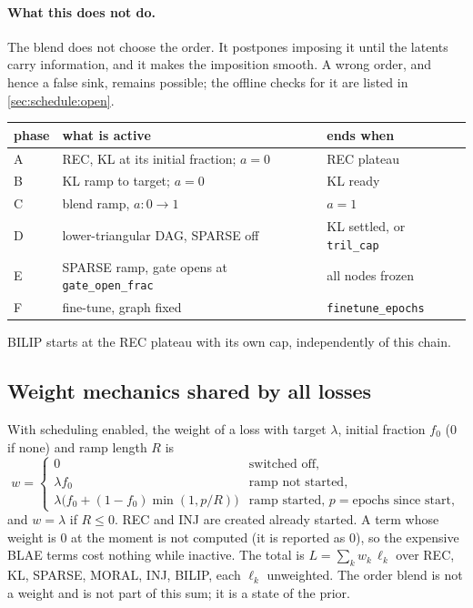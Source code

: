 \paragraph{What this does not do.}
The blend does not choose the order. It postpones imposing it until the latents carry
information, and it makes the imposition smooth. A wrong order, and hence a false
sink, remains possible; the offline checks for it are listed in
\cref{sec:schedule:open}.

\begin{center}
\begin{tabular}{@{}lll@{}}
\toprule
phase & what is active & ends when\\
\midrule
A & REC, KL at its initial fraction; $a=0$ & REC plateau\\
B & KL ramp to target; $a=0$ & KL ready\\
C & blend ramp, $a:0\to1$ & $a=1$\\
D & lower-triangular DAG, SPARSE off & KL settled, or \texttt{tril\_cap}\\
E & SPARSE ramp, gate opens at \texttt{gate\_open\_frac} & all nodes frozen\\
F & fine-tune, graph fixed & \texttt{finetune\_epochs}\\
\bottomrule
\end{tabular}
\end{center}
BILIP starts at the REC plateau with its own cap, independently of this chain.

\subsection{Weight mechanics shared by all losses}
\label{sec:schedule:weights}
With scheduling enabled, the weight of a loss with target $\lambda$, initial fraction
$f_0$ ($0$ if none) and ramp length $R$ is
\[
w=\begin{cases}
0 & \text{switched off},\\
\lambda f_0 & \text{ramp not started},\\
\lambda\bigl(f_0+(1-f_0)\min(1,p/R)\bigr) & \text{ramp started, } p=\text{epochs
since start},
\end{cases}
\]
and $w=\lambda$ if $R\le0$. REC and INJ are created already started. A term whose
weight is $0$ at the moment is not computed (it is reported as $0$), so the expensive
BLAE terms cost nothing while inactive. The total is $L=\sum_k w_k\,\ell_k$ over REC,
KL, SPARSE, MORAL, INJ, BILIP, each $\ell_k$ unweighted. The order blend is not a
weight and is not part of this sum; it is a state of the prior.

